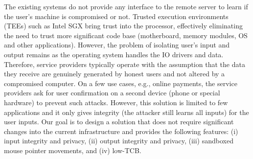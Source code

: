 
The existing systems do not provide any interface to the remote server to learn if the user's machine is compromised or not. Trusted execution environments (TEEs) such as Intel SGX bring trust into the processor, effectively eliminating the need to trust more significant code base (motherboard, memory modules, OS and other applications). However, the problem of isolating user's input and output remains as the operating system handles the IO drivers and data. Therefore, service providers typically operate with the assumption that the data they receive are genuinely generated by honest users and not altered by a compromised computer. On a few use cases, e.g., online payments, the service providers ask for user confirmation on a second device (phone or special hardware) to prevent such attacks. However, this solution is limited to few applications and it only gives integrity (the attacker still learns all inputs) for the user inputs. Our goal is to design a solution that does not require significant changes into the current infrastructure and provides the following features: (i) input integrity and privacy, (ii) output integrity and privacy, (iii) sandboxed mouse pointer movements, and (iv) low-TCB.



